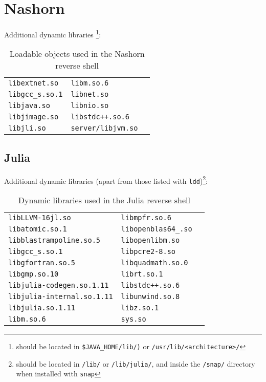 \newpage

\section*{Nashorn}


Additional dynamic libraries \footnote{should be located in \texttt{\$JAVA\_HOME/lib/)} or \texttt{/usr/lib/<architecture>/}}:

\begin{longtable}{l l l}
\caption{Loadable objects used in the Nashorn reverse shell}\label{tab:nashorn-dpd} \\
\texttt{libextnet.so} & \texttt{libm.so.6} \\
\texttt{libgcc\_s.so.1} & \texttt{libnet.so} \\
\texttt{libjava.so} & \texttt{libnio.so} \\
\texttt{libjimage.so} & \texttt{libstdc++.so.6} \\
\texttt{libjli.so} & \texttt{server/libjvm.so} \\
\end{longtable}


\subsection*{Julia}


Additional dynamic libraries (apart from those listed with \texttt{ldd})\footnote{should be located in \texttt{/lib/} or \texttt{/lib/julia/}, and inside the \texttt{/snap/} directory when installed with \texttt{snap}}:

\begin{longtable}{l l l}
\caption{Dynamic libraries used in the Julia reverse shell}\label{tab:julia-dpd} \\
\texttt{libLLVM-16jl.so} & \texttt{libmpfr.so.6} \\
\texttt{libatomic.so.1} & \texttt{libopenblas64\_.so} \\
\texttt{libblastrampoline.so.5} & \texttt{libopenlibm.so} \\
\texttt{libgcc\_s.so.1} & \texttt{libpcre2-8.so} \\
\texttt{libgfortran.so.5} & \texttt{libquadmath.so.0} \\
\texttt{libgmp.so.10} & \texttt{librt.so.1} \\
\texttt{libjulia-codegen.so.1.11} & \texttt{libstdc++.so.6} \\
\texttt{libjulia-internal.so.1.11} & \texttt{libunwind.so.8} \\
\texttt{libjulia.so.1.11} & \texttt{libz.so.1} \\
\texttt{libm.so.6} & \texttt{sys.so} \\
\end{longtable}

